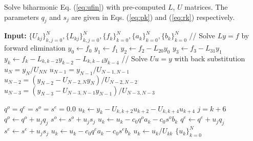 \documentclass[11pt, oneside]{article}
\begin{document}
\begin{algorithm}
	\caption{Solve biharmonic Eq. (\ref{eq:ufin}) with pre-computed $L$, $U$ 
	matrices. The parameters $q_j$ and $s_j$ are given in Eqs. (\ref{eq:pk}) 
	and 
	(\ref{eq:rk}) respectively. }
	\label{alg:SolveBiharmonic}
	\begin{algorithmic}[1]
		  \State \textbf{Input:} $\{U_{kj}\}_{k,j=0}^{N}, 
		  \{L_{kj}\}_{k,j=0}^{N}, 
		  \{f_k\}_{k=0}^{N}, \{a_k\}_{k=0}^{N}, \{b_k\}_{k=0}^{N}$ 
		  \State // Solve $Ly=f$ by forward elimination 
		  \State $y_0 \gets f_0$
		  \State $y_1 \gets f_1$
		  \State $y_2 \gets f_2 - L_{20}y_{0}$
		  \State $y_3 \gets f_3 - L_{31}y_{1}$
		  \State $y_k \gets f_k - L_{k,k-2}y_{k-2} - L_{k, k-4}y_{k-4}$
		  \EndFor
		  \State // Solve $Uu=y$ with back substitution                    
		  \State $u_N = y_N / U_{NN}$
	      \State $u_{N-1} = y_{N-1} / U_{N-1,N-1}$
	      \State $u_{N-2} = \left(y_{N-2} - U_{N-2, N}y_N\right)/U_{N-2,N-2}$
	      \State $u_{N-3} = \left(y_{N-3} - U_{N-3, 
	      N-1}y_{N-1}\right)/U_{N-3,N-3}$
	      
	      \State $q^o = q^e = s^o = s^e = 0.0$
		  \State $u_k \gets y_k - U_{k, k+2} u_{k+2} - U_{k, k+4} 
		  u_{k+4} $ 
		  \State $j=k+6$
		    \State $q^o \gets q^o + u_{j}q_{j}$
		    \State $s^o \gets s^o + u_{j}s_{j}$
		    \State $u_k \gets u_k - c_0 q^o a_k - c_0 s^o b_k $	    
		  \Else
		    \State $q^e \gets q^e + u_{j}q_{j}$
		    \State $s^e \gets s^e + u_{j}s_{j}$	  
		    \State $u_k \gets u_k - c_0 q^e a_k - c_0 s^e b_k $
		  \EndIf
		  \EndIf
		  \State $u_k \gets  u_k / U_{kk}$
		  \EndFor
		  \State \Return $\{u_k\}_{k=0}^{N}$  
		  
		\EndProcedure
	\end{algorithmic}
\end{algorithm}


\end{document}
